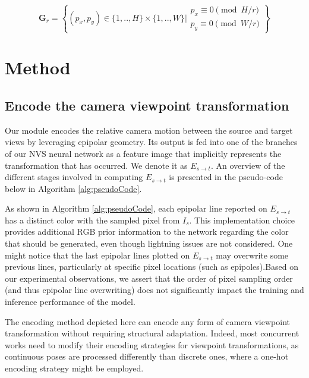 \begin{equation}
    \mathbf{G}_{r} = \left\{(p_{x},p_{y}) \in \{1,..,H\}\times \{1,..,W\} \Big\rvert \begin{array}{l}
                    p_x \equiv 0 \pmod{H/r}\\
             p_y \equiv 0 \pmod{W/r}
              \end{array}\right\}
\end{equation}

\section{Method}

\subsection{Encode the camera viewpoint transformation}

Our module encodes the relative camera motion between the source and target views by leveraging epipolar geometry. Its output is fed into one of the branches of our \ac{NVS} neural network as a feature image that implicitly represents the transformation that has occurred. We denote it as $E_{s\xrightarrow{}t}$.
An overview of the different stages involved in computing $E_{s\xrightarrow{}t}$ is presented in the pseudo-code below in Algorithm \ref{alg:pseudoCode}. \newline

As shown in Algorithm \ref{alg:pseudoCode}, each epipolar line reported on $E_{s\xrightarrow{}t}$ has a distinct color with the sampled pixel from $I_s$. This implementation choice provides additional RGB prior information to the network regarding the color that should be generated, even though lightning issues are not considered. One might notice that the last epipolar lines plotted on $E_{s\xrightarrow{}t}$ may overwrite some previous lines, particularly at specific pixel locations (such as epipoles).Based on our experimental observations, we assert that the order of pixel sampling order (and thus epipolar line overwriting) does not significantly impact the training and inference performance of the model. 

The encoding method depicted here can encode any form of camera viewpoint transformation without requiring structural adaptation. Indeed, most concurrent works need to modify their encoding strategies for viewpoint transformations, as continuous poses are processed differently than discrete ones, where a one-hot encoding strategy might be employed. 

